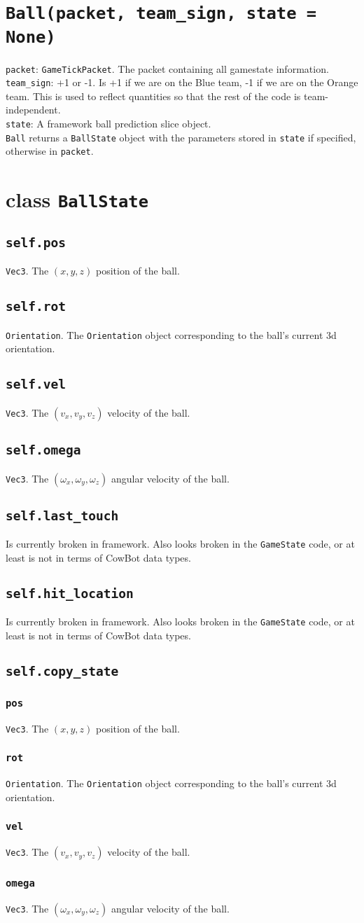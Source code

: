 \documentclass{article}
\newcommand{\class}[1]{\section{class \texttt{#1}}}
\newcommand{\attribute}[1]{\subsection{\texttt{self.#1}}}
\newcommand{\method}[1]{\subsection{\texttt{self.#1}}}
\newcommand{\function}[1]{\section{\texttt{#1}}}
\newcommand{\argumentb}[1]{\subsubsection{\texttt{#1}}}
\begin{document}
\begin{flushleft}
{      }






\function{Ball(packet, team\_sign, state = None)}
         {
           \texttt{packet}: \texttt{GameTickPacket}.  The packet containing all gamestate information.\\
           \texttt{team\_sign}: +1 or -1.  Is +1 if we are on the Blue team, -1 if we are on the Orange team.  This is used to reflect quantities so that the rest of the code is team-independent.\\
           \texttt{state}: A framework ball prediction slice object.\\
           \texttt{Ball} returns a \texttt{BallState} object with the parameters stored in \texttt{state} if specified, otherwise in \texttt{packet}.
         }




\class{BallState}
      {
        \attribute{pos}
                  {
                    \texttt{Vec3}.  The $(x , y , z)$ position of the ball.
                  }
        \attribute{rot}
                  {
                    \texttt{Orientation}.  The \texttt{Orientation} object corresponding to the ball's current 3d orientation. 
                  }
        \attribute{vel}
                  {
                    \texttt{Vec3}.  The $(v_x , v_y , v_z)$ velocity of the ball.
                  }
        \attribute{omega}
                  {
                    \texttt{Vec3}.  The $(\omega_x , \omega_y , \omega_z)$ angular velocity of the ball.
                  }
        \attribute{last\_touch}
                  {
                    Is currently broken in framework.   Also looks broken in the \texttt{GameState} code, or at least is not in terms of CowBot data types.
                  }
        \attribute{hit\_location}
                  {
                    Is currently broken in framework.   Also looks broken in the \texttt{GameState} code, or at least is not in terms of CowBot data types.                    
                  }


        \method{copy\_state}
               {
        \argumentb{pos}
                  {
                    \texttt{Vec3}.  The $(x , y , z)$ position of the ball.
                  }
        \argumentb{rot}
                  {
                    \texttt{Orientation}.  The \texttt{Orientation} object corresponding to the ball's current 3d orientation. 
                  }
        \argumentb{vel}
                  {
                    \texttt{Vec3}.  The $(v_x , v_y , v_z)$ velocity of the ball.
                  }
        \argumentb{omega}
                  {
                    \texttt{Vec3}.  The $(\omega_x , \omega_y , \omega_z)$ angular velocity of the ball.
                  }                 
               }

}
\end{flushleft}
\end{document}
